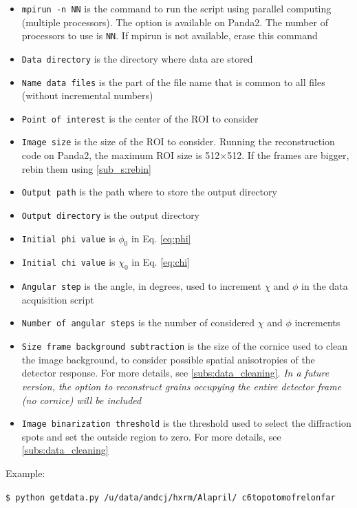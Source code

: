 \documentclass[11pt]{scrartcl}
\begin{document}
\begin{itemize}
    \item {\texttt{mpirun -n NN}} is the command to run the script using parallel computing (multiple processors). The option is available on Panda2. The number of processors to use is {\texttt{NN}}. If mpirun is not available, erase this command
    \item {\texttt{Data directory}} is the directory where data are stored
    \item {\texttt{Name data files}} is the part of the file name that is common to all files (without incremental numbers)
    \item {\texttt{Point of interest}} is the center of the {\footnotesize{ROI}} to consider
    \item {\texttt{Image size}} is the size of the {\footnotesize{ROI}} to consider. Running the reconstruction code on Panda2, the maximum {\footnotesize{ROI}} size is 512$\times$512. If the frames are bigger, rebin them using \ref{sub_s:rebin}
    \item {\texttt{Output path}} is the path where to store the output directory
    \item {\texttt{Output directory}} is the output directory
    \item {\texttt{Initial phi value}} is $\phi_0$ in Eq. \ref{eq:phi}
    \item {\texttt{Initial chi value}} is $\chi_0$ in Eq. \ref{eq:chi}
    \item {\texttt{Angular step}} is the angle, in degrees, used to increment $\chi$ and $\phi$ in the data acquisition script
    \item {\texttt{Number of angular steps}} is the number of considered $\chi$ and $\phi$ increments
    \item {\texttt{Size frame background subtraction}} is the size of the cornice used to clean the image background, to consider possible spatial anisotropies of the detector response. For more details, see {\ref{subs:data_cleaning}}. {\textit{In a future version, the option to reconstruct grains occupying the entire detector frame (no cornice) will be included}}
    \item {\texttt{Image binarization threshold}} is the threshold used to select the diffraction spots and set the outside region to zero. For more details, see {\ref{subs:data_cleaning}}
\end{itemize}

Example: 

{\texttt{\$ python getdata.py /u/data/andcj/hxrm/Al\textunderscore april/ c6\textunderscore topotomo\textunderscore frelon\textunderscore far\textunderscore}} 
\end{document}
